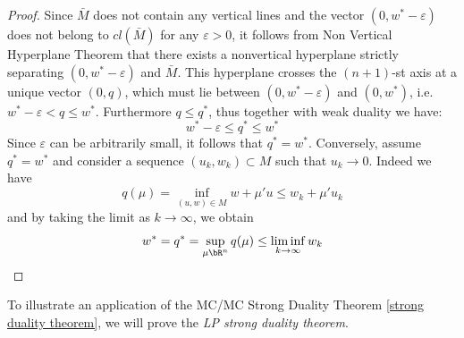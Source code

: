 \documentclass[11pt,a4paper,oneside,openany]{book}
\numberwithin{definition}{section}
\numberwithin{theorem}{section}
\numberwithin{problem}{section}
\begin{document}
\begin{proof}
    Since $\bar M$ does not contain any vertical lines and the vector \((0,w^*-\varepsilon)\) does not belong to \(cl(\bar M)\) for any \(\varepsilon > 0\), it follows from Non Vertical Hyperplane Theorem that there exists a nonvertical hyperplane strictly separating $(0, w^*-\varepsilon)$ and $\bar M$. This hyperplane crosses the $(n+1)$-st axis at a unique vector \((0,q)\), which must lie between \((0, w^* - \varepsilon)\) and \((0,w^*)\), i.e. $w^*-\varepsilon < q \leq w^*$. Furthermore $q \leq q^*$, thus together with weak duality we have: \begin{equation*}
        w^* - \varepsilon \leq q^* \leq w^*
    \end{equation*}
    Since $\varepsilon$ can be arbitrarily small, it follows that $q^* = w^*$. Conversely, assume $q^* = w^*$ and consider a sequence \((u_k,w_k) \subset M\) such that $u_k \to 0$. Indeed we have\begin{equation}
        q(\mu) = \inf_{(u,w) \in M} w + \mu'u \leq w_k + \mu' u_k
    \end{equation}
    and by taking the limit as $k \to \infty$, we obtain \begin{equation*}
        w^* = q^* = \sup_{\mu \bR^n}q(\mu) \leq \liminf_{k \to \infty}w_k
    \end{equation*}
\end{proof}

To illustrate an application of the MC/MC Strong Duality Theorem \ref{strong duality theorem}, we will prove the \emph{LP strong duality theorem}.
\end{document}
